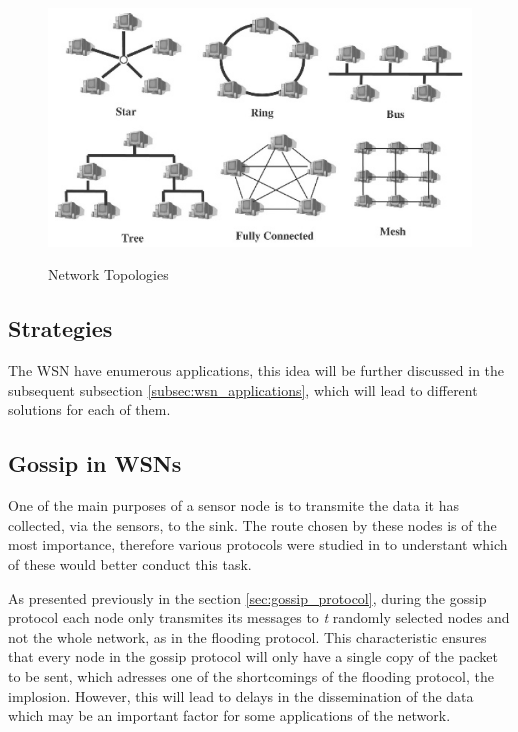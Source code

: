 \begin{figure}[h]
    \caption{Network Topologies \cite{Lewis2004}}
    \centering
    \includegraphics[scale=0.7]{Chapters/Figures/network_topologies.png}
    \label{fig:network_topologies}
\end{figure}

\subsection{Strategies}
\label{subsec:wsn_strategies}
The WSN have enumerous applications, this idea will be further discussed in the subsequent
subsection \ref{subsec:wsn_applications}, which will lead to different solutions for each of
them.

\subsection{Gossip in WSNs}
\label{subsec:gossip_in_wsns}
One of the main purposes of a sensor node is to transmite the data it has collected, via
the sensors, to the sink. The route chosen by these nodes is of the most importance,
therefore various protocols were studied in \cite{Akkaya2005} to understant which of
these would better conduct this task.

As presented previously in the section \ref{sec:gossip_protocol}, during the gossip protocol
each node only transmites its messages to \textit{t} randomly selected nodes and not the
whole network, as in the flooding protocol. This characteristic ensures that every node
in the gossip protocol will only have a single copy of the packet to be sent, which
adresses one of the shortcomings of the flooding protocol, the implosion. However, this
will lead to delays in the dissemination of the data which may be an important factor
for some applications of the network.

